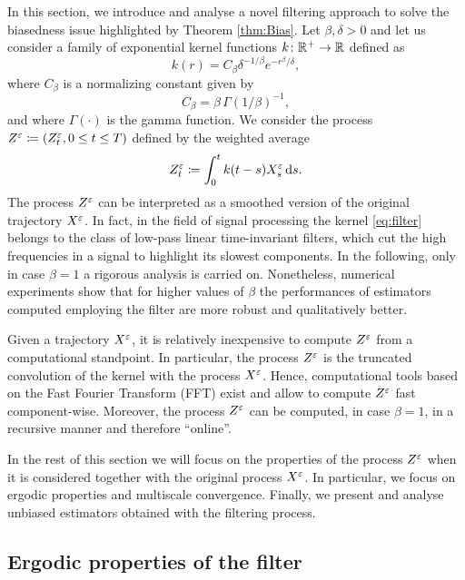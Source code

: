 \documentclass[10pt]{article}
\begin{document}
In this section, we introduce and analyse a novel filtering approach to solve the biasedness issue highlighted by Theorem \ref{thm:Bias}. Let $\beta, \delta > 0$ and let us consider a family of exponential kernel functions $k \colon \mathbb{R}^+ \to \mathbb{R}$ defined as
\begin{equation}\label{eq:filter}
k(r) = C_\beta \delta^{-1/\beta} e^{-r^\beta/\delta},
\end{equation}
where $C_{\beta}$ is a normalizing constant given by
\begin{equation}
C_\beta = \beta \, \Gamma(1/\beta)^{-1},
\end{equation}
and where $\Gamma(\cdot)$ is the gamma function. We consider the process $Z^\varepsilon \coloneqq (Z^\varepsilon_t, 0 \leq t \leq T)$ defined by the weighted average
\begin{equation}\label{eq:ZDef}
	Z^{\varepsilon}_t \coloneqq \int_0^t k(t - s)X^\varepsilon_s \,\mathrm{d} s.
\end{equation}
The process $Z^\varepsilon$ can be interpreted as a smoothed version of the original trajectory $X^\varepsilon$. In fact, in the field of signal processing the kernel \eqref{eq:filter} belongs to the class of low-pass linear time-invariant filters, which cut the high frequencies in a signal to highlight its slowest components. In the following, only in case $\beta = 1$ a rigorous analysis is carried on. Nonetheless, numerical experiments show that for higher values of $\beta$ the performances of estimators computed employing the filter are more robust and qualitatively better. 

\begin{remark} Given a trajectory $X^\varepsilon$, it is relatively inexpensive to compute $Z^\varepsilon$ from a computational standpoint. In particular, the process $Z^\varepsilon$ is the truncated convolution of the kernel with the process $X^\varepsilon$. Hence, computational tools based on the Fast Fourier Transform (FFT) exist and allow to compute $Z^\varepsilon$ fast component-wise. Moreover, the process $Z^\varepsilon$ can be computed, in case $\beta = 1$, in a recursive manner and therefore ``online''.
\end{remark}

In the rest of this section we will focus on the properties of the process $Z^\varepsilon$ when it is considered together with the original process $X^\varepsilon$. In particular, we focus on ergodic properties and multiscale convergence. Finally, we present and analyse unbiased estimators obtained with the filtering process.

\subsection{Ergodic properties of the filter}\label{sec:ergodic}
\end{document}
